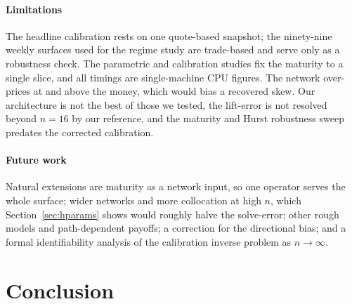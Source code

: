 \documentclass[preprint,12pt]{elsarticle}
\begin{document}
\paragraph{Limitations}
The headline calibration rests on one quote-based snapshot; the ninety-nine
weekly surfaces used for the regime study are trade-based and serve only as a
robustness check. The parametric and calibration studies fix the maturity to a
single slice, and all timings are single-machine CPU figures. The network
over-prices at and above the money, which would bias a recovered skew. Our
architecture is not the best of those we tested, the lift-error is not resolved
beyond $n{=}16$ by our reference, and the maturity and Hurst robustness sweep
predates the corrected calibration.

\paragraph{Future work}
Natural extensions are maturity as a network input, so one operator serves the
whole surface; wider networks and more collocation at high $n$, which
Section~\ref{sec:hparams} shows would roughly halve the solve-error; other rough
models and path-dependent payoffs; a correction for the directional bias; and a
formal identifiability analysis of the calibration inverse problem as
$n\to\infty$.

\section{Conclusion}
\label{sec:conc}
\end{document}
